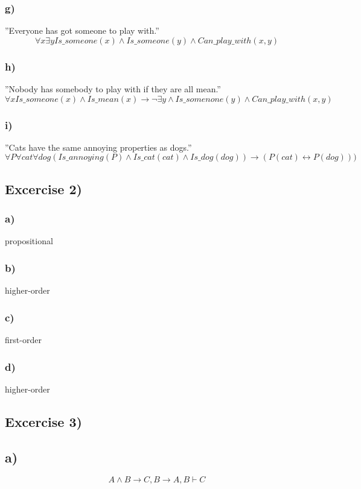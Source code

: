 \documentclass[12pt]{article}
\begin{document}
\subsubsection*{g)}
”Everyone has got someone to play with.”
\begin{equation}
  \forall x \exists y Is\_someone(x) \land Is\_someone(y) \land Can\_play\_with(x, y)
\end{equation}
\subsubsection*{h)}
”Nobody has somebody to play with if they are all mean.”
\begin{equation}
  \forall x Is\_someone(x) \land Is\_mean(x) \rightarrow  \neg \exists y \land Is\_somenone(y)\land Can\_play\_with(x, y)
\end{equation}
\subsubsection*{i)}
”Cats have the same annoying properties as dogs.”
\begin{equation}
  \forall P \forall cat \forall dog (Is\_annoying(P) \land Is\_cat(cat) \land Is\_dog(dog)) \rightarrow  (P(cat) \leftrightarrow P(dog)))
\end{equation}
\subsection*{Excercise 2)}
\subsubsection*{a)}
propositional
\subsubsection*{b)}
higher-order
\subsubsection*{c)}
first-order
\subsubsection*{d)}
higher-order
\subsection*{Excercise 3)}
\subsection*{a)}
\begin{equation}
  A \land B \rightarrow C, B \rightarrow A, B \vdash C
\end{equation}
\end{document}
